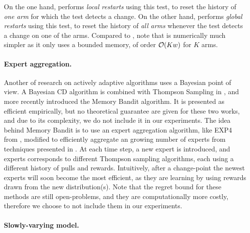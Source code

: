 On the one hand, \CUSUMUCB{} performs \emph{local restarts} using this test, to reset the history of \emph{one arm} for which the test detects a change.
On the other hand, \MUCB{} performs \emph{global restarts} using this test, to reset the history of \emph{all arms} whenever the test detects a change on one of the arms.
Compared to \CUSUMUCB{}, note that \MUCB{} is numerically much simpler as it only uses a bounded memory, of order $\mathop{}\mathopen{}\mathcal{O}\mathopen{}\left(K w\right)$ for $K$ arms.


\paragraph{Expert aggregation.}
%
Another of research on actively adaptive algorithms uses a Bayesian point of view.
A Bayesian CD algorithm is combined with Thompson Sampling in \cite{MellorShapiro13},
and more recently \cite{Alami17} introduced the Memory Bandit algorithm.
It is presented as efficient empirically, but no theoretical guarantee are given for these two works, and due to its complexity, we do not include it in our experiments.
The idea behind Memory Bandit is to use an expert aggregation algorithm, like EXP4 from \cite{Auer02}, modified to efficiently aggregate an growing number of experts from techniques presented in \cite{Mourtada17}.
At each time step, a new expert is introduced, and experts corresponds to different Thompson sampling algorithms, each using a different history of pulls and rewards. Intuitively, after a change-point the newest experts will soon become the most efficient, as they are learning by using rewards drawn from the new distribution(s).
%
Note that the regret bound for these methods are still open-problems,
and they are computationally more costly,
therefore we choose to not include them in our experiments.


\paragraph{Slowly-varying model.}

